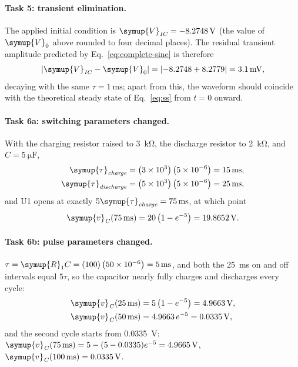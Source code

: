 \documentclass[12pt,a4paper]{article}
\begin{document}
	\paragraph{Task 5: transient elimination.}
	The applied initial condition is
	$\symup{V}_{\mathit{IC}} = \SI{-8.2748}{\volt}$ (the value of $\symup{V}_{0}$ above rounded to
	four decimal places).  The residual transient amplitude predicted by
	Eq.~\eqref{eq:complete-sine} is therefore
	\begin{equation}
		\left|\symup{V}_{\mathit{IC}} - \symup{V}_{0}\right| = \left|-8.2748 + 8.2779\right|
		= \SI{3.1}{\milli\volt},
	\end{equation}
	decaying with the same $\tau = \SI{1}{\milli\second}$; apart from
	this, the waveform should coincide with the theoretical steady state
	of Eq.~\eqref{eq:ss} from $t = 0$ onward.
	
	\paragraph{Task 6a: switching parameters changed.}
	With the charging resistor raised to \SI{3}{\kilo\ohm}, the
	discharge resistor to \SI{2}{\kilo\ohm}, and
	$C = \SI{5}{\micro\farad}$,
	\begin{align}
		\symup{\tau}_{\mathit{charge}} &= \left(3\times 10^{3}\right)\left(5\times 10^{-6}\right)
		= \SI{15}{\milli\second}, \\
		\symup{\tau}_{\mathit{discharge}} &= \left(5\times 10^{3}\right)\left(5\times 10^{-6}\right)
		= \SI{25}{\milli\second},
	\end{align}
	and U1 opens at exactly $5\symup{\tau}_{\mathit{charge}} =
	\SI{75}{\milli\second}$, at which point
	\begin{equation}
		\symup{v}_{\mathit{C}}(\SI{75}{\milli\second}) = 20\left(1 - e^{-5}\right)
		= \SI{19.8652}{\volt}.
	\end{equation}
	
	\paragraph{Task 6b: pulse parameters changed.}
	$\tau = \symup{R}_{1} C = (100)\left(50\times 10^{-6}\right) =
	\SI{5}{\milli\second}$, and both the \SI{25}{\milli\second} on and
	off intervals equal $5\tau$, so the capacitor nearly fully charges
	and discharges every cycle:
	\begin{align}
		\symup{v}_{\mathit{C}}(\SI{25}{\milli\second}) &= 5\left(1 - e^{-5}\right)
		= \SI{4.9663}{\volt},\\
		\symup{v}_{\mathit{C}}(\SI{50}{\milli\second}) &= 4.9663\, e^{-5} = \SI{0.0335}{\volt},
	\end{align}
	and the second cycle starts from \SI{0.0335}{\volt}:
	$\symup{v}_{\mathit{C}}(\SI{75}{\milli\second}) = 5 - (5 - 0.0335)e^{-5} =
	\SI{4.9665}{\volt}$, $\symup{v}_{\mathit{C}}(\SI{100}{\milli\second}) = \SI{0.0335}{\volt}$.
	
\end{document}
